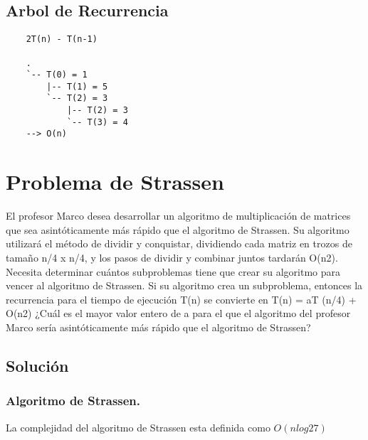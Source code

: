 \documentclass[12pt]{exam}
\begin{document}
\subsection*{Arbol de Recurrencia}
\begin{verbatim}
    2T(n) - T(n-1)

    .
    `-- T(0) = 1
        |-- T(1) = 5
        `-- T(2) = 3
            |-- T(2) = 3 
            `-- T(3) = 4
    --> O(n)
\end{verbatim}

\section*{Problema de Strassen}

El profesor Marco desea desarrollar un algoritmo de multiplicación de matrices
que sea asintóticamente más rápido que el algoritmo de Strassen. Su algoritmo utilizará el
método de dividir y conquistar, dividiendo cada matriz en trozos de tamaño n/4 x n/4, y los
pasos de dividir y combinar juntos tardarán O(n2). Necesita determinar cuántos subproblemas
tiene que crear su algoritmo para vencer al algoritmo de Strassen. Si su algoritmo crea
un subproblema, entonces la recurrencia para el tiempo de ejecución T(n) se convierte en
T(n) = aT (n/4) + O(n2) ¿Cuál es el mayor valor entero de a para el que el algoritmo del
profesor Marco sería asintóticamente más rápido que el algoritmo de Strassen?

\subsection*{Solución}
\subsubsection*{Algoritmo de Strassen.}
La complejidad del algoritmo de Strassen esta definida como $ O (nlog2 7) $ \cite[CENK2017484]{keylist}
\end{document}
